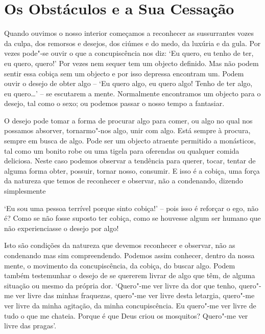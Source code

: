 \chapter{Os Obstáculos e a Sua Cessação}

Quando ouvimos o nosso interior começamos a reconhecer as sussurrantes
vozes da culpa, dos remorsos e desejos, dos ciúmes e do medo, da luxúria
e da gula. Por vezes pode"-se ouvir o que a concupiscência nos diz: `Eu
quero, eu tenho de ter, eu quero, quero!' Por vezes nem sequer tem um
objecto definido. Mas não podem sentir essa cobiça sem um objecto e por
isso depressa encontram um. Podem ouvir o desejo de obter algo -- `Eu
quero algo, eu quero algo! Tenho de ter algo, eu quero\ldots{}' -- se
escutarem a mente. Normalmente encontramos um objecto para o desejo, tal
como o sexo; ou podemos passar o nosso tempo a fantasiar.

O desejo pode tomar a forma de procurar algo para comer, ou algo no qual
nos possamos absorver, tornarmo"-nos algo, unir com algo. Está sempre à
procura, sempre em busca de algo. Pode ser um objecto atraente permitido
a monásticos, tal como um bonito robe ou uma tigela para oferendas ou
qualquer comida deliciosa. Neste caso podemos observar a tendência para
querer, tocar, tentar de alguma forma obter, possuir, tornar nosso,
consumir. E isso é a cobiça, uma força da natureza que temos de
reconhecer e observar, não a condenando, dizendo simplesmente

`Eu sou uma pessoa terrível porque sinto cobiça!' -- pois isso é
reforçar o ego, não é? Como se não fosse suposto ter cobiça, como se
houvesse algum ser humano que não experienciasse o desejo por algo!

Isto são condições da natureza que devemos reconhecer e
observar, não as condenando mas sim compreendendo. Podemos
assim conhecer, dentro da nossa mente, o movimento da concupiscência, da
cobiça, do buscar algo. Podem também testemunhar o desejo de se quererem
livrar de algo que têm, de alguma situação ou mesmo da própria dor.
`Quero"-me ver livre da dor que tenho, quero"-me ver livre das minhas
fraquezas, quero"-me ver livre desta letargia, quero"-me ver livre da
minha agitação, da minha concupiscência. Eu quero"-me ver livre de tudo o
que me chateia. Porque é que Deus criou os mosquitos? Quero"-me ver livre
das pragas'.

